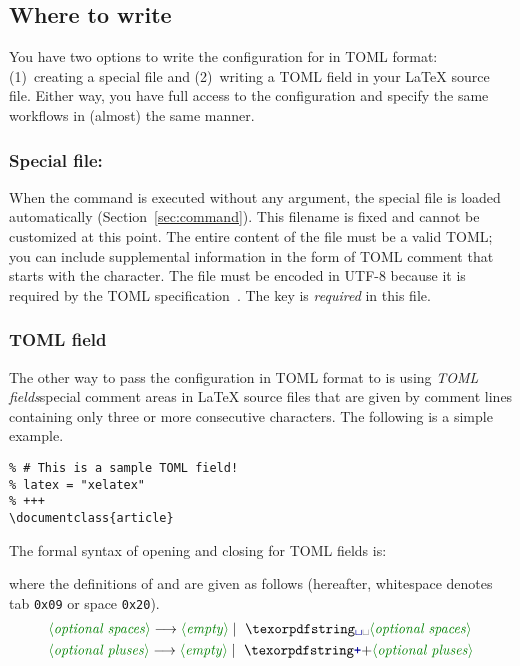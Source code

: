 \documentclass{llmk-doc}
\begin{document}
\subsection{Where to write}
\label{sec:toml-where}

You have two options to write the configuration for  in TOML format:
(1)~creating a special file  and (2)~writing a TOML field in
your {\LaTeX} source file. Either way, you have full access to the 
configuration and specify the same workflows in (almost) the same manner.

\subsubsection*{Special file: }

When the  command is executed without any argument, the special file
 is loaded automatically (Section~\ref{sec:command}). This
filename is fixed and cannot be customized at this point. The entire content of
the file must be a valid TOML; you can include supplemental information in the
form of TOML comment that starts with the \code{\#} character. The file must
be encoded in UTF-8 because it is required by the TOML
specification~\cite{toml}. The  key is \emph{required} in this
file.

\subsubsection*{TOML field}

The other way to pass the configuration in TOML format to  is using
\emph{TOML fields}\Dash special comment areas in {\LaTeX} source files that are
given by comment lines containing only three or more consecutive \code{+}
characters. The following is a simple example.
%
\begin{lstlisting}[style=latex]
% +++
% # This is a sample TOML field!
% latex = "xelatex"
% +++
\documentclass{article}
\end{lstlisting}

The formal syntax of opening and closing for TOML fields is:
%
\begin{htcode}
\end{htcode}
%
where the definitions of  and  are
given as follows (hereafter, whitespace \code{\textvisiblespace} denotes tab
\texttt{0x09} or space \texttt{0x20}).
%
\begin{align*}
&\text{\meta{optional spaces}}
  \longrightarrow \text{\meta{empty}}
  \mid\text{\code{\textvisiblespace}\meta{optional spaces}} \\
&\text{\meta{optional pluses}}
  \longrightarrow \text{\meta{empty}}
  \mid\text{\code{+}\meta{optional pluses}}
\end{align*}
\end{document}
